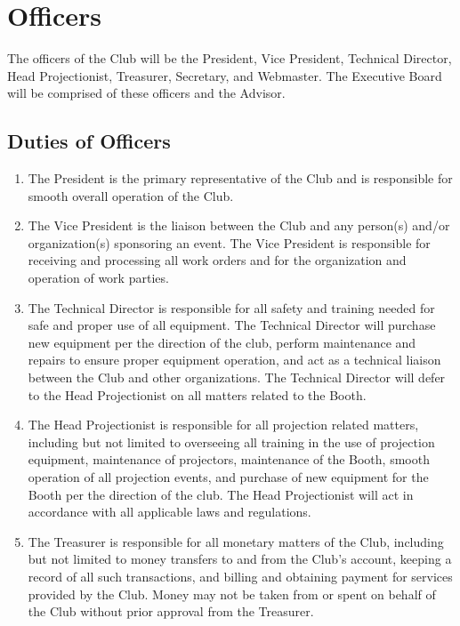 \documentclass[12pt,letterpaper,oneside]{book}
\begin{document}
\chapter{Officers}

The officers of the Club will be the President, Vice President, Technical Director, Head Projectionist, Treasurer, Secretary, and Webmaster. The Executive Board will be comprised of these officers and the Advisor.

\section{Duties of Officers}

\begin{enumerate}

\item The President is the primary representative of the Club and is responsible for smooth overall operation of the Club.
\item The Vice President is the liaison between the Club and any person(s) and/or organization(s) sponsoring an event. The Vice President is responsible for receiving and processing all work orders and for the organization and operation of work parties.
\item The Technical Director is responsible for all safety and training needed for safe and proper use of all equipment. The Technical Director will purchase new equipment per the direction of the club, perform maintenance and repairs to ensure proper equipment operation, and act as a technical liaison between the Club and other organizations.  The Technical Director will defer to the Head Projectionist on all matters related to the Booth.
\item The Head Projectionist is responsible for all projection related matters, including but not limited to overseeing all training in the use of projection equipment, maintenance of projectors, maintenance of the Booth, smooth operation of all projection events, and purchase of new equipment for the Booth per the direction of the club. The Head Projectionist will act in accordance with all applicable laws and regulations.
\item The Treasurer is responsible for all monetary matters of the Club, including but not limited to money transfers to and from the Club’s account, keeping a record of all such transactions, and billing and obtaining payment for services provided by the Club. Money may not be taken from or spent on behalf of the Club without prior approval from the Treasurer.

\end{enumerate}
\end{document}

